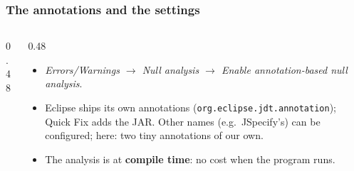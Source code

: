 \documentclass[aspectratio=169,10pt,compress]{beamer}
\begin{document}
\begin{frame}[t,fragile] \frametitle{The annotations and the settings}
  \begin{columns}[T]
    \begin{column}{0.48\textwidth}
    \end{column}
    \begin{column}{0.48\textwidth}
      \begin{itemize}\small
        \item \emph{Errors/Warnings $\to$ Null analysis $\to$ Enable annotation-based null analysis}.
        \item Eclipse ships its own annotations (\texttt{org.eclipse.jdt.annotation}); Quick Fix adds the JAR.
              Other names (e.g.\ JSpecify's) can be configured; here: two tiny annotations of our own.
        \item The analysis is at \textbf{compile time}: no cost when the program runs.
      \end{itemize}
    \end{column}
  \end{columns}
\end{frame}

\end{document}
